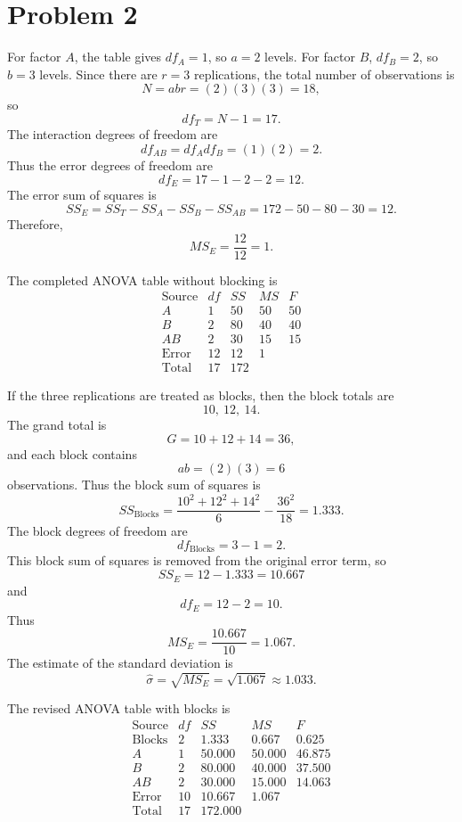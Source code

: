\documentclass[answers,12pt,addpoints]{exam}
\begin{document}
\section{Problem 2}

\begin{solution}
For factor $A$, the table gives $df_A=1$, so $a=2$ levels. For factor $B$, $df_B=2$, so $b=3$ levels. Since there are $r=3$ replications, the total number of observations is
\[
N=abr=(2)(3)(3)=18,
\]
so
\[
df_T=N-1=17.
\]
The interaction degrees of freedom are
\[
df_{AB}=df_A df_B=(1)(2)=2.
\]
Thus the error degrees of freedom are
\[
df_E=17-1-2-2=12.
\]
The error sum of squares is
\[
SS_E=SS_T-SS_A-SS_B-SS_{AB}
=172-50-80-30=12.
\]
Therefore,
\[
MS_E=\frac{12}{12}=1.
\]

The completed ANOVA table without blocking is
\[
\begin{array}{c|c|c|c|c}
\text{Source} & df & SS & MS & F \\
\hline
A & 1 & 50 & 50 & 50 \\
B & 2 & 80 & 40 & 40 \\
AB & 2 & 30 & 15 & 15 \\
\text{Error} & 12 & 12 & 1 & \\
\hline
\text{Total} & 17 & 172 & & 
\end{array}
\]

If the three replications are treated as blocks, then the block totals are
\[
10,\ 12,\ 14.
\]
The grand total is
\[
G=10+12+14=36,
\]
and each block contains
\[
ab=(2)(3)=6
\]
observations. Thus the block sum of squares is
\[
SS_{\text{Blocks}}
=
\frac{10^2+12^2+14^2}{6}
-
\frac{36^2}{18}
=
1.333.
\]
The block degrees of freedom are
\[
df_{\text{Blocks}}=3-1=2.
\]
This block sum of squares is removed from the original error term, so
\[
SS_E=12-1.333=10.667
\]
and
\[
df_E=12-2=10.
\]
Thus
\[
MS_E=\frac{10.667}{10}=1.067.
\]
The estimate of the standard deviation is
\[
\hat{\sigma}=\sqrt{MS_E}=\sqrt{1.067}\approx 1.033.
\]

The revised ANOVA table with blocks is
\[
\begin{array}{c|c|c|c|c}
\text{Source} & df & SS & MS & F \\
\hline
\text{Blocks} & 2 & 1.333 & 0.667 & 0.625 \\
A & 1 & 50.000 & 50.000 & 46.875 \\
B & 2 & 80.000 & 40.000 & 37.500 \\
AB & 2 & 30.000 & 15.000 & 14.063 \\
\text{Error} & 10 & 10.667 & 1.067 & \\
\hline
\text{Total} & 17 & 172.000 & &
\end{array}
\]


\end{solution}
\end{document}

